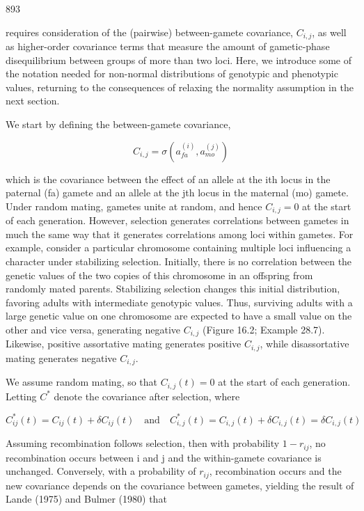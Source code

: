 \documentclass{article}
\begin{document}
893

requires consideration of the (pairwise) between-gamete covariance,  $ C_{i,j} $, as well as higher-order covariance terms that measure the amount of gametic-phase disequilibrium between groups of more than two loci. Here, we introduce some of the notation needed for non-normal distributions of genotypic and phenotypic values, returning to the consequences of relaxing the normality assumption in the next section.

We start by defining the between-gamete covariance,

\begin{equation}
C_{i,j}=\sigma\left(a_{fa}^{(i)},a_{mo}^{(j)}\right)
\tag{24.10}
\label{eq:24_10}
\end{equation}

which is the covariance between the effect of an allele at the ith locus in the paternal (fa) gamete and an allele at the jth locus in the maternal (mo) gamete. Under random mating, gametes unite at random, and hence  $ C_{i,j} = 0 $ at the start of each generation. However, selection generates correlations between gametes in much the same way that it generates correlations among loci within gametes. For example, consider a particular chromosome containing multiple loci influencing a character under stabilizing selection. Initially, there is no correlation between the genetic values of the two copies of this chromosome in an offspring from randomly mated parents. Stabilizing selection changes this initial distribution, favoring adults with intermediate genotypic values. Thus, surviving adults with a large genetic value on one chromosome are expected to have a small value on the other and vice versa, generating negative  $ C_{i,j} $ (Figure 16.2; Example 28.7). Likewise, positive assortative mating generates positive  $ C_{i,j} $, while disassortative mating generates negative  $ C_{i,j} $.

We assume random mating, so that  $ C_{i,j}(t) = 0 $ at the start of each generation. Letting  $ C^{*} $ denote the covariance after selection, where

\begin{equation}
C_{i j}^{*}(t)=C_{i j}(t)+\delta C_{i j}(t)\quad\mathrm{a n d}\quad C_{i,j}^{*}(t)=C_{i,j}(t)+\delta C_{i,j}(t)=\delta C_{i,j}(t)
\tag{21.11a}
\label{eq:21_11a}
\end{equation}

Assuming recombination follows selection, then with probability  $ 1 - r_{ij} $, no recombination occurs between i and j and the within-gamete covariance is unchanged. Conversely, with a probability of  $ r_{ij} $, recombination occurs and the new covariance depends on the covariance between gametes, yielding the result of Lande (1975) and Bulmer (1980) that
\end{document}
